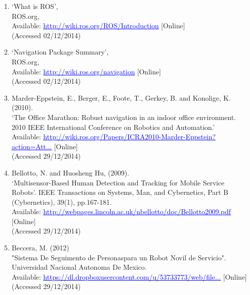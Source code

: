 \documentclass{article}
\begin{document}
\begin{enumerate}
\item ‘What is ROS’,
\\ROS.org,
\\Available: \href{http://wiki.ros.org/ROS/Introduction}{\textcolor{blue}{\uline{http://wiki.ros.org/ROS/Introduction}}} [Online]
\\(Accessed 02/12/2014)

\item ‘Navigation Package Summary’,
\\ROS.org,
\\Available: \href{http://wiki.ros.org/navigation}{\textcolor{blue}{\uline{http://wiki.ros.org/navigation}}} [Online]
\\(Accessed 02/12/2014)

\item Marder-Eppstein, E., Berger, E., Foote, T., Gerkey, B. and Konolige, K. (2010).
\\‘The Office Marathon: Robust navigation in an indoor office environment. 2010 IEEE International Conference on Robotics and Automation.’
\\Available: \href{http://wiki.ros.org/Papers/ICRA2010_Marder-Eppstein?action=AttachFile&do=view&target=icra2010_marder-eppstein.pdf}{\textcolor{blue}{\uline{http://wiki.ros.org/Papers/ICRA2010-Marder-Eppstein?action=Att...}}} [Online]
\\(Accessed 29/12/2014)

\item Bellotto, N. and Huosheng Hu, (2009).
\\‘Multisensor-Based Human Detection and Tracking for Mobile Service Robots’. IEEE Transactions on Systems, Man, and Cybernetics, Part B (Cybernetics), 39(1), pp.167-181. \\ Available: \href{http://webpages.lincoln.ac.uk/nbellotto/doc/Bellotto2009.pdf}{\textcolor{blue}{\uline{http://webpages.lincoln.ac.uk/nbellotto/doc/Bellotto2009.pdf}}} [Online]
\\(Accessed 29/12/2014)

\item Beccera, M. (2012)
\\"Sistema De Seguimento de Personaspara un Robot Novil de Servicio". Universidad Nacional Autonoma De Mexico.
\\Available: \href{https://dl.dropboxusercontent.com/u/53733773/web/files/Becerra12_MEngThesis.pdf}{\textcolor{blue}{\uline{https://dl.dropboxusercontent.com/u/53733773/web/file...}}} [Online]
\\(Accessed 29/12/2014)

\end{enumerate}
\end{document}
